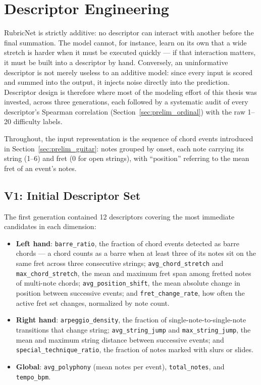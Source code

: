 \section{Descriptor Engineering}
\label{sec:descriptors}
RubricNet is strictly additive: no descriptor can interact with another before the final summation. The model cannot, for instance, learn on its own that a wide stretch is harder when it must be executed quickly --- if that interaction matters, it must be built into a descriptor by hand. Conversely, an uninformative descriptor is not merely useless to an additive model: since every input is scored and summed into the output, it injects noise directly into the prediction. Descriptor design is therefore where most of the modeling effort of this thesis was invested, across three generations, each followed by a systematic audit of every descriptor's Spearman correlation (Section~\ref{sec:prelim_ordinal}) with the raw 1--20 difficulty labels.

Throughout, the input representation is the sequence of chord events introduced in Section~\ref{sec:prelim_guitar}: notes grouped by onset, each note carrying its string (1--6) and fret (0 for open strings), with ``position'' referring to the mean fret of an event's notes.

\subsection{V1: Initial Descriptor Set}
The first generation contained 12 descriptors covering the most immediate candidates in each dimension:
\begin{itemize}
    \item \textbf{Left hand}: \texttt{barre\_ratio}, the fraction of chord events detected as barre chords --- a chord counts as a barre when at least three of its notes sit on the same fret across three consecutive strings; \texttt{avg\_chord\_stretch} and \texttt{max\_chord\_stretch}, the mean and maximum fret span among fretted notes of multi-note chords; \texttt{avg\_position\_shift}, the mean absolute change in position between successive events; and \texttt{fret\_change\_rate}, how often the active fret set changes, normalized by note count.
    \item \textbf{Right hand}: \texttt{arpeggio\_density}, the fraction of single-note-to-single-note transitions that change string; \texttt{avg\_string\_jump} and \texttt{max\_string\_jump}, the mean and maximum string distance between successive events; and \texttt{special\_technique\_ratio}, the fraction of notes marked with slurs or slides.
    \item \textbf{Global}: \texttt{avg\_polyphony} (mean notes per event), \texttt{total\_notes}, and \texttt{tempo\_bpm}.
\end{itemize}

